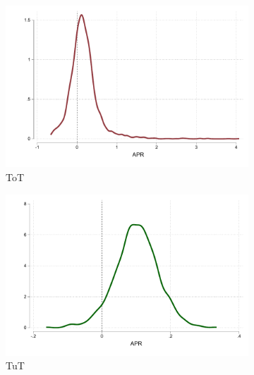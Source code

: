 \documentclass[12pt, a4paper]{article}
\begin{document}
\vspace{.2in}
\begin{figure}[!h]
     \caption{Heterogeneous Treatment Effects.} 
     \label{heterogeneous_effects}    
    \begin{center}
     \begin{subfigure}{0.35\textwidth}
       \centering
      \includegraphics[width=\textwidth]{Figuras/he_dist_tau_hat_tot.pdf}
          \caption{ToT}
    \end{subfigure}
    \begin{subfigure}{0.35\textwidth}
       \centering
      \includegraphics[width=\textwidth]{Figuras/he_dist_tau_hat_tut.pdf}
          \caption{TuT}
    \end{subfigure} 
       \begin{subfigure}{.35\textwidth}
        \centering

\end{subfigure}
\end{center}
\end{figure}
\end{document}
